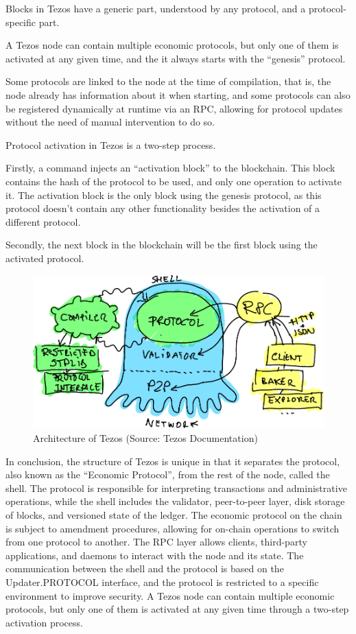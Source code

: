 Blocks in Tezos have a generic part, understood by any protocol, and a protocol-specific part.

A Tezos node can contain multiple economic protocols, but only one of them is activated at any given time, and the it always starts with the ``genesis'' protocol.

Some protocols are linked to the node at the time of compilation, that is, the node already has information about it when starting, and some protocols can also be registered dynamically at runtime via an RPC, allowing for protocol updates without the need of manual intervention to do so.

Protocol activation in Tezos is a two-step process.

Firstly, a command injects an ``activation block'' to the blockchain. This block contains the hash of the protocol to be used, and only one operation to activate it. The activation block is the only block using the genesis protocol, as this protocol doesn't contain any other functionality besides the activation of a different protocol.

Secondly, the next block in the blockchain will be the first block using the activated protocol. 


\begin{figure}[H]
    \centering
    \includegraphics[width=\textwidth,keepaspectratio]{imagens/octupus.pdf}
    \caption{Architecture of Tezos (Source: Tezos Documentation)}
    \label{fig:octupus}

\end{figure}

In conclusion, the structure of Tezos is unique in that it separates the protocol, also known as the ``Economic Protocol'', from the rest of the node, called the shell. The protocol is responsible for interpreting transactions and administrative operations, while the shell includes the validator, peer-to-peer layer, disk storage of blocks, and versioned state of the ledger. The economic protocol on the chain is subject to amendment procedures, allowing for on-chain operations to switch from one protocol to another. The RPC layer allows clients, third-party applications, and daemons to interact with the node and its state. The communication between the shell and the protocol is based on the Updater.PROTOCOL interface, and the protocol is restricted to a specific environment to improve security. A Tezos node can contain multiple economic protocols, but only one of them is activated at any given time through a two-step activation process.


